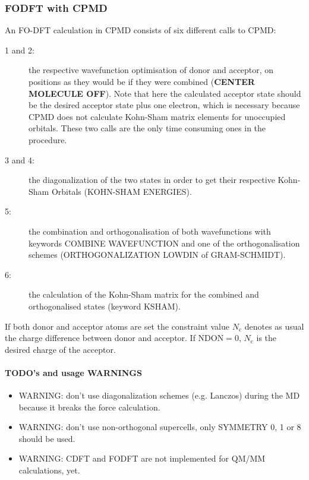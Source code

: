 \documentclass[twoside,10pt,titlepage,a4paper]{article}
\begin{document}
\subsubsection{FODFT with CPMD}
An FO-DFT calculation in CPMD consists of six different calls to CPMD:
\begin{description}
\item[1 and 2:] the respective wavefunction optimisation of donor and acceptor, on positions as they
would be if they were combined (\textbf{CENTER MOLECULE OFF}). Note that here the calculated
acceptor state should be the desired acceptor state plus one electron, which is necessary because
CPMD does not calculate Kohn-Sham matrix elements for unoccupied orbitals. These two calls are the
only time consuming ones in the procedure.  \item[3 and 4:] the diagonalization of the two states in
order to get their respective Kohn-Sham Orbitals (KOHN-SHAM ENERGIES).
\item[5:] the combination and orthogonalisation of both wavefunctions with keywords COMBINE WAVEFUNCTION and one of the orthogonalisation schemes (ORTHOGONALIZATION LOWDIN of GRAM-SCHMIDT).
\item[6:] the calculation of the Kohn-Sham matrix for the combined and orthogonalised states (keyword KSHAM).
\end{description}


If both donor and acceptor atoms are set the constraint value $N_\text{c}$ denotes as usual the charge difference between donor and acceptor. If NDON$=0$, $N_\text{c}$ is the desired charge of the acceptor.

\paragraph{TODO's and usage WARNINGS}
\begin{itemize}
\item WARNING: don't use diagonalization schemes (e.g. Lanczos) during the MD because it breaks the force calculation.
\item WARNING: don't use non-orthogonal supercells, only SYMMETRY 0, 1 or 8 should be used.
\item WARNING: CDFT and FODFT are not implemented for QM/MM calculations, yet.
\end{itemize}

\end{document}
